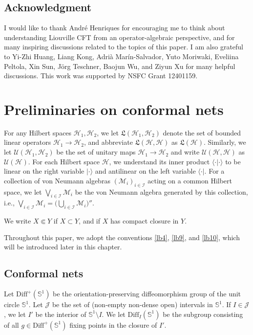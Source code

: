 \documentclass[11pt,b5paper,notitlepage]{article}
\theoremstyle{definition}
\theoremstyle{plain}
\newcommand{\fk}{\mathfrak}
\newcommand{\mc}{\mathcal}
\newcommand{\Diff}{\mathrm{Diff}}
\newcommand{\DiffS}{\mathrm{Diff}^+(\mathbb S^1)}
\newcommand{\bk}[1]{\langle {#1}\rangle}
\newcommand{\scr}{\mathscr}
\newcommand{\Sbb}{{\mathbb S}}
\newcommand{\MH}{\mathcal H}
\newcommand{\MJ}{\mathcal J}
\newcommand{\MU}{\mathcal U}
\numberwithin{equation}{section}
\begin{document}
\subsection*{Acknowledgment}


I would like to thank Andr\'e Henriques for encouraging me to think about understanding Liouville CFT from an operator-algebraic perspective, and for many inspiring discussions related to the topics of this paper. I am also grateful to Yi-Zhi Huang, Liang Kong, Adri\`a Mar\'in-Salvador, Yuto Moriwaki, Eveliina Peltola, Xin Sun, J\"org Teschner, Baojun Wu, and Ziyun Xu for many helpful discussions. This work was supported by NSFC Grant 12401159.






\section{Preliminaries on conformal nets}

For any Hilbert spaces $\MH_1,\MH_2$, we let $\fk L(\MH_1,\MH_2)$ denote the set of bounded linear operators $\MH_1\rightarrow\MH_2$, and abbreviate $\fk L(\MH,\MH)$ as $\fk L(\MH)$. Similarly, we let $\MU(\MH_1,\MH_2)$ be the set of unitary maps $\MH_1\rightarrow\MH_2$ and write $\MU(\MH,\MH)$ as $\MU(\MH)$. For each Hilbert space $\MH$, we understand its inner product $\bk{\cdot|\cdot}$ to be linear on the right variable $|\cdot\rangle$ and antilinear on the left variable $\langle\cdot|$. For a collection of von Neumann algebras $(\mc M_i)_{i\in\scr I}$ acting on a common Hilbert space, we let $\bigvee_{i\in\scr I}\mc M_i$ be the von Neumann algebra generated by this collection, i.e., $\bigvee_{i\in\scr I}\mc M_i=\big(\bigcup_{i\in\scr I}\mc M_i\big)''$.

We write $X\Subset Y$ if $X\subset Y$, and if $X$ has compact closure in $Y$.

Throughout this paper, we adopt the conventions \ref{lb4}, \ref{lb9}, and \ref{lb10}, which will be introduced later in this chapter.



\subsection{Conformal nets}



Let $\DiffS$ be the orientation-preserving diffeomorphism group of the unit circle $\Sbb^1$. Let $\MJ$ be the set of (non-empty non-dense open) intervals in $\Sbb^1$. If $I\in\MJ$, we let $I'$ be the interior of $\Sbb^1\setminus I$. We let $\Diff_I(\Sbb^1)$ be the subgroup consisting of all $g\in\DiffS$ fixing points in the closure of $I'$. 
\end{document}
